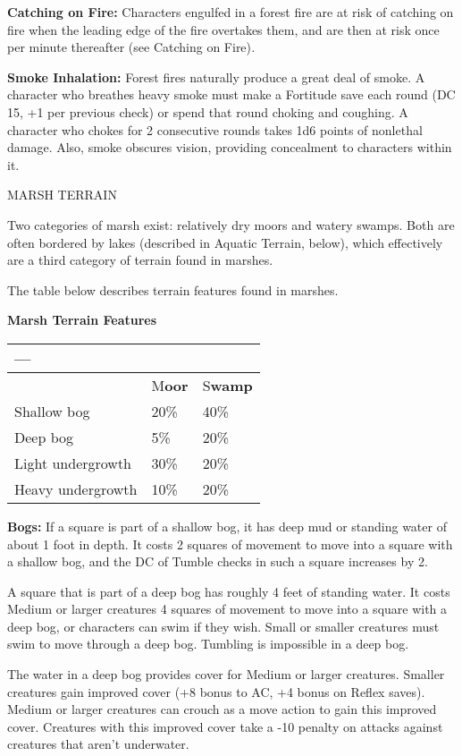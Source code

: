 \documentclass{article}
\begin{document}
\textbf{Catching on Fire:} Characters engulfed in a forest fire are at risk of 
catching on fire when the leading edge of the fire overtakes them, and are then 
at risk once per minute thereafter (see Catching on Fire)\textit{.}

\textbf{Smoke Inhalation:} Forest fires naturally produce a great deal of smoke. 
A character who breathes heavy smoke must make a Fortitude save each round (DC 
15, +1 per previous check) or spend that round choking and coughing. A character 
who chokes for 2 consecutive rounds takes 1d6 points of nonlethal damage. Also, 
smoke obscures vision, providing concealment to characters within it.

\vspace{12pt}
MARSH TERRAIN

Two categories of marsh exist: relatively dry moors and watery swamps. Both are 
often bordered by lakes (described in Aquatic Terrain, below), which effectively 
are a third category of terrain found in marshes.

The table below describes terrain features found in marshes.

\textbf{Marsh Terrain Features}

\begin{tabular}{|>{\raggedright}p{78pt}|>{\raggedright}p{35pt}|>{\raggedright}p{46pt}|}
\hline
 --- & \multicolumn{2}{p{82pt}|}{ \textbf{Marsh Category ---}}\tabularnewline
\hline
  & M\textbf{oor} & S\textbf{wamp}\tabularnewline
\hline
Shallow bog & 20\% & 40\%\tabularnewline
\hline
Deep bog & 5\% & 20\%\tabularnewline
\hline
Light undergrowth & 30\% & 20\%\tabularnewline
\hline
Heavy undergrowth & 10\% & 20\%\tabularnewline
\hline
\end{tabular}

\textbf{Bogs:} If a square is part of a shallow bog, it has deep mud or standing 
water of about 1 foot in depth. It costs 2 squares of movement to move into a square 
with a shallow bog, and the DC of Tumble checks in such a square increases by 2. 

A square that is part of a deep bog has roughly 4 feet of standing water. It costs 
Medium or larger creatures 4 squares of movement to move into a square with a deep 
bog, or characters can swim if they wish. Small or smaller creatures must swim 
to move through a deep bog. Tumbling is impossible in a deep bog.

The water in a deep bog provides cover for Medium or larger creatures. Smaller 
creatures gain improved cover (+8 bonus to AC, +4 bonus on Reflex saves). Medium 
or larger creatures can crouch as a move action to gain this improved cover. Creatures 
with this improved cover take a -10 penalty on attacks against creatures that aren't 
underwater.
\end{document}

